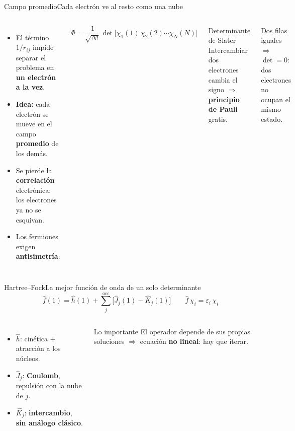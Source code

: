 \documentclass[aspectratio=169]{beamer}
\newcommand{\cplx}[1]{{\footnotesize\color{cookieMuted}#1}}
\begin{document}
\begin{frame}{Campo promedio}{Cada electrón ve al resto como una nube}
  \begin{columns}[T,onlytextwidth]
      \begin{itemize}\setlength\itemsep{5pt}
        \item El término $1/r_{ij}$ impide separar el problema en \textbf{un electrón a la vez}.
        \item \textbf{Idea:} cada electrón se mueve en el campo \textbf{promedio} de los demás.
        \item Se pierde la \textbf{correlación} electrónica: los electrones ya no se esquivan.
        \item Los fermiones exigen \textbf{antisimetría}:
      \end{itemize}
      \[ \Phi=\frac{1}{\sqrt{N!}}\det\bigl[\chi_1(1)\,\chi_2(2)\cdots\chi_N(N)\bigr] \]
      \begin{block}{Determinante de Slater}
        Intercambiar dos electrones cambia el signo $\Rightarrow$ \textbf{principio de Pauli} gratis.
      \end{block}
      \cplx{Dos filas iguales $\Rightarrow$ $\det=0$: dos electrones no ocupan el mismo estado.}
  \end{columns}
\end{frame}

\begin{frame}{Hartree--Fock}{La mejor función de onda de un solo determinante}
  \[ \hat f(1)=\hat h(1)+\sum_{j}^{\mathrm{occ}}\bigl[\hat J_j(1)-\hat K_j(1)\bigr] \qquad \hat f\,\chi_i=\varepsilon_i\,\chi_i \]
  \vspace{.2em}
  \begin{columns}[T,onlytextwidth]
      \begin{itemize}\setlength\itemsep{4pt}
        \item $\hat h$: cinética + atracción a los núcleos.
        \item $\hat J_j$: \textbf{Coulomb}, repulsión con la nube de $j$.
        \item $\hat K_j$: \textbf{intercambio}, \textbf{sin análogo clásico}.
      \end{itemize}
      \begin{exampleblock}{Lo importante}
        El operador depende de sus propias soluciones $\Rightarrow$ ecuación \textbf{no lineal}: hay que iterar.
      \end{exampleblock}
  \end{columns}
\end{frame}
\end{document}
